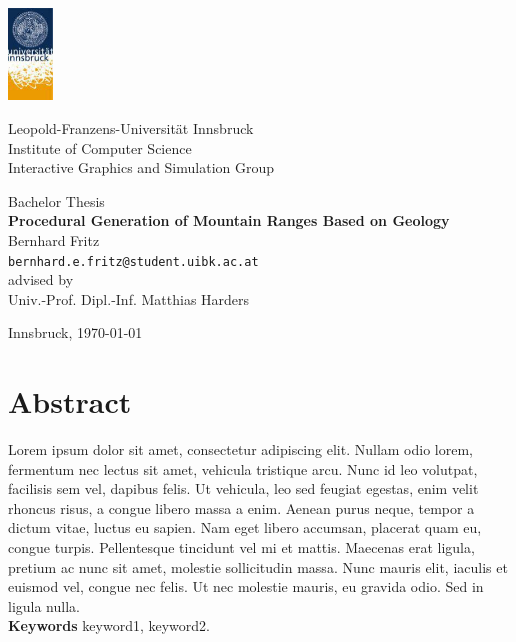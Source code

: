 \documentclass[11pt,a4paper,twoside,openright]{report}
\begin{document}

\begin{titlepage} %

\begin{center}
\includegraphics[width=1.2cm]{images/uibk}

\begin{large}
Leopold-Franzens-Universität Innsbruck\\[5mm]
Institute of Computer Science\\
Interactive Graphics and Simulation Group\\[25mm]
\end{large}

Bachelor Thesis\\[15mm]

{\LARGE \bf Procedural Generation of Mountain Ranges Based on Geology}\\[15mm]

Bernhard Fritz\\
\texttt{bernhard.e.fritz@student.uibk.ac.at}\\[35mm]

advised by\\
Univ.-Prof. Dipl.-Inf. Matthias Harders\\[10mm]

\vfill

Innsbruck, \today
\end{center}

\end{titlepage}





\chapter*{Abstract}
Lorem ipsum dolor sit amet, consectetur adipiscing elit. Nullam odio lorem, fermentum nec lectus sit amet, vehicula tristique arcu. Nunc id leo volutpat, facilisis sem vel, dapibus felis. Ut vehicula, leo sed feugiat egestas, enim velit rhoncus risus, a congue libero massa a enim. Aenean purus neque, tempor a dictum vitae, luctus eu sapien. Nam eget libero accumsan, placerat quam eu, congue turpis. Pellentesque tincidunt vel mi et mattis. Maecenas erat ligula, pretium ac nunc sit amet, molestie sollicitudin massa. Nunc mauris elit, iaculis et euismod vel, congue nec felis. Ut nec molestie mauris, eu gravida odio. Sed in ligula nulla.
\medskip
\noindent \\\textbf{Keywords} keyword1, keyword2.
\end{document}
